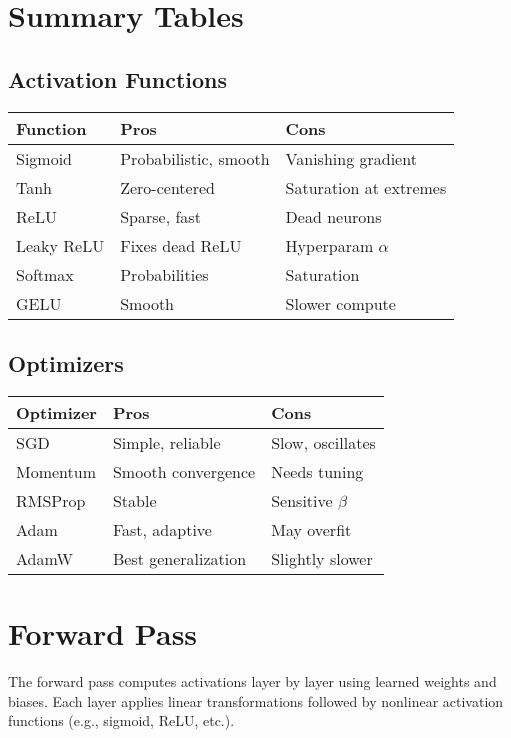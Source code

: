 \documentclass[11pt]{article}
\begin{document}

\section{Summary Tables}

\subsection*{Activation Functions}
\begin{tabular}{|l|l|l|}
\hline
Function & Pros & Cons \\ \hline
Sigmoid & Probabilistic, smooth & Vanishing gradient \\
Tanh & Zero-centered & Saturation at extremes \\
ReLU & Sparse, fast & Dead neurons \\
Leaky ReLU & Fixes dead ReLU & Hyperparam $\alpha$ \\
Softmax & Probabilities & Saturation \\
GELU & Smooth & Slower compute \\ \hline
\end{tabular}

\subsection*{Optimizers}
\begin{tabular}{|l|l|l|}
\hline
Optimizer & Pros & Cons \\ \hline
SGD & Simple, reliable & Slow, oscillates \\
Momentum & Smooth convergence & Needs tuning \\
RMSProp & Stable & Sensitive $\beta$ \\
Adam & Fast, adaptive & May overfit \\
AdamW & Best generalization & Slightly slower \\ \hline
\end{tabular}

\newpage







\section{Forward Pass}

\noindent
The forward pass computes activations layer by layer using learned weights and biases. Each layer applies linear transformations followed by nonlinear activation functions (e.g., sigmoid, ReLU, etc.).
\end{document}
